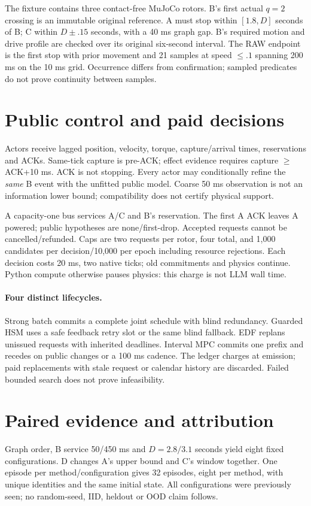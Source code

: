 \documentclass{article}
\begin{document}
The fixture contains three contact-free MuJoCo rotors. B's first actual
$q=2$ crossing is an immutable original reference. A must stop within
$[1.8,D]$ seconds of B; C within $D\pm.15$ seconds, with a 40 ms graph gap.
B's required motion and drive profile are checked over its original
six-second interval. The RAW endpoint is the first stop with prior
movement and 21 samples at speed $\le.1$ spanning 200 ms on the 10 ms
grid. Occurrence differs from confirmation; sampled predicates do not
prove continuity between samples.

\section{Public control and paid decisions}
Actors receive lagged position, velocity, torque, capture/arrival times,
reservations and ACKs. Same-tick capture is pre-ACK; effect evidence
requires capture $\ge$ACK+10 ms. ACK is not stopping. Every actor may
conditionally refine the \emph{same} B event with the unfitted public
model. Coarse 50 ms observation is not an information lower bound;
compatibility does not certify physical support.

A capacity-one bus services A/C and B's reservation. The first A ACK
leaves A powered; public hypotheses are none/first-drop. Accepted
requests cannot be cancelled/refunded. Caps are two requests per rotor,
four total, and 1,000 candidates per decision/10,000 per epoch including
resource rejections. Each decision costs 20 ms, two native ticks;
old commitments and physics continue. Python compute otherwise pauses
physics: this charge is not LLM wall time.

\paragraph{Four distinct lifecycles.}
Strong batch commits a complete joint schedule with blind redundancy.
Guarded HSM uses a safe feedback retry slot or the same blind fallback.
EDF replans unissued requests with inherited deadlines. Interval MPC
commits one prefix and recedes on public changes or a 100 ms cadence.
The ledger charges at emission; paid replacements with stale request or
calendar history are discarded. Failed bounded search does not prove
infeasibility.

\section{Paired evidence and attribution}
Graph order, B service 50/450 ms and $D=2.8/3.1$ seconds yield eight
fixed configurations. D changes A's upper bound and C's window together.
One episode per method/configuration gives 32 episodes, eight per
method, with unique identities and the same initial state. All
configurations were previously seen; no random-seed, IID, heldout or
OOD claim follows.
\end{document}
